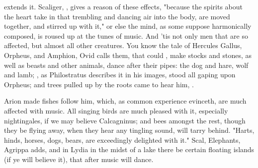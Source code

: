 {extends it. Scaliger, , gives a reason of these effects, "because the spirits about the heart take in that trembling and dancing air into the body, are moved together, and stirred up with it," or else the mind, as some suppose harmonically composed, is roused up at the tunes of music. And 'tis not only men that are so affected, but almost all other creatures. You know the tale of Hercules Gallus, Orpheus, and Amphion,  Ovid calls them, that could , \etc{} make stocks and stones, as well as beasts and other animals, dance after their pipes: the dog and hare, wolf and lamb; , as Philostratus describes it in his images, stood all gaping upon Orpheus; and trees pulled up by the roots came to hear him, .

Arion made fishes follow him, which, as common experience evinceth, are much affected with music. All singing birds are much pleased with it, especially nightingales, if we may believe Calcagninus; and bees amongst the rest, though they be flying away, when they hear any tingling sound, will tarry behind. "Harts, hinds, horses, dogs, bears, are exceedingly delighted with it." Scal,  Elephants, Agrippa adds,  and in Lydia in the midst of a lake there be certain floating islands (if ye will believe it), that after music will dance.

}
